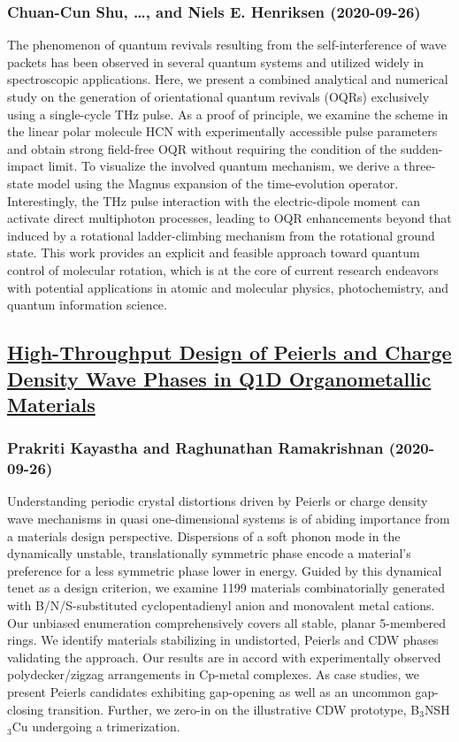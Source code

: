 \subsubsection*{Chuan-Cun Shu, \dots, and Niels E. Henriksen (2020-09-26)}
The phenomenon of quantum revivals resulting from the self-interference of
wave packets has been observed in several quantum systems and utilized widely
in spectroscopic applications. Here, we present a combined analytical and
numerical study on the generation of orientational quantum revivals (OQRs)
exclusively using a single-cycle THz pulse. As a proof of principle, we examine
the scheme in the linear polar molecule HCN with experimentally accessible
pulse parameters and obtain strong field-free OQR without requiring the
condition of the sudden-impact limit. To visualize the involved quantum
mechanism, we derive a three-state model using the Magnus expansion of the
time-evolution operator. Interestingly, the THz pulse interaction with the
electric-dipole moment can activate direct multiphoton processes, leading to
OQR enhancements beyond that induced by a rotational ladder-climbing mechanism
from the rotational ground state. This work provides an explicit and feasible
approach toward quantum control of molecular rotation, which is at the core of
current research endeavors with potential applications in atomic and molecular
physics, photochemistry, and quantum information science.

\subsection*{\href{http://arxiv.org/abs/2009.12519v1}{High-Throughput Design of Peierls and Charge Density Wave Phases in Q1D  Organometallic Materials}}
\subsubsection*{Prakriti Kayastha and Raghunathan Ramakrishnan (2020-09-26)}
Understanding periodic crystal distortions driven by Peierls or charge
density wave mechanisms in quasi one-dimensional systems is of abiding
importance from a materials design perspective. Dispersions of a soft phonon
mode in the dynamically unstable, translationally symmetric phase encode a
material's preference for a less symmetric phase lower in energy. Guided by
this dynamical tenet as a design criterion, we examine 1199 materials
combinatorially generated with B/N/S-substituted cyclopentadienyl anion and
monovalent metal cations. Our unbiased enumeration comprehensively covers all
stable, planar 5-membered rings. We identify materials stabilizing in
undistorted, Peierls and CDW phases validating the approach. Our results are in
accord with experimentally observed polydecker/zigzag arrangements in Cp-metal
complexes. As case studies, we present Peierls candidates exhibiting
gap-opening as well as an uncommon gap-closing transition. Further, we zero-in
on the illustrative CDW prototype, B$_3$NSH$_3$Cu undergoing a trimerization.


